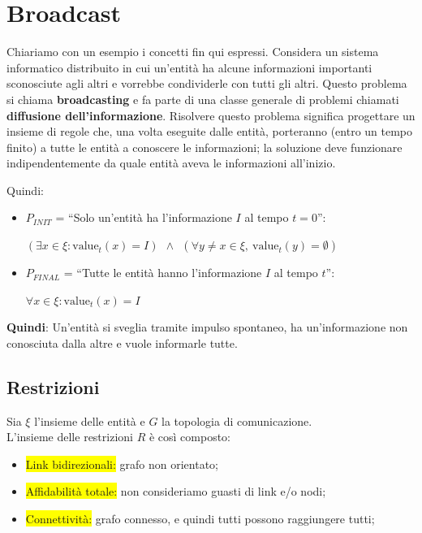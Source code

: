 \chapter{Broadcast}
Chiariamo con un esempio i concetti fin qui espressi. Considera un sistema
informatico distribuito in cui un'entità ha alcune informazioni importanti
sconosciute agli altri e vorrebbe condividerle con tutti gli altri. Questo
problema si chiama \textbf{broadcasting} e fa parte di una classe generale di
problemi chiamati \textbf{diffusione dell'informazione}. Risolvere questo
problema significa progettare un insieme di regole che, una volta eseguite dalle
entità, porteranno (entro un tempo finito) a tutte le entità a conoscere le
informazioni; la soluzione deve funzionare indipendentemente da quale entità
aveva le informazioni all'inizio.

Quindi:
\begin{itemize}
    \item $P_{INIT}$ = ``Solo un'entità ha l'informazione $I$ al tempo $t=0$'':
          \begin{center}
              $(\exists x \in \xi : \textrm{value}_t(x) = I) ~~ \wedge ~~ (\forall y
                  \neq x \in \xi,~\textrm{value}_t(y) = \emptyset)$
          \end{center}
    \item $P_{FINAL}$ = ``Tutte le entità hanno l'informazione $I$ al tempo $t$'':
          \begin{center}
              $\forall x \in \xi : \textrm{value}_t(x) = I$
          \end{center}
\end{itemize}

\textbf{Quindi}: Un'entità si sveglia tramite impulso spontaneo, ha
un'informazione non conosciuta dalla altre e vuole informarle tutte.

\section{Restrizioni}
Sia $\xi$ l'insieme delle entità e $G$ la topologia di comunicazione.\\
L'insieme delle restrizioni $R$ è così composto:
\begin{itemize}
    \item \colorbox{yellow}{Link bidirezionali:} grafo non orientato;
    \item \colorbox{yellow}{Affidabilità totale:} non consideriamo guasti di link
          e/o nodi;
    \item \colorbox{yellow}{Connettività:} grafo connesso, e quindi tutti possono
          raggiungere tutti;
\end{itemize}

